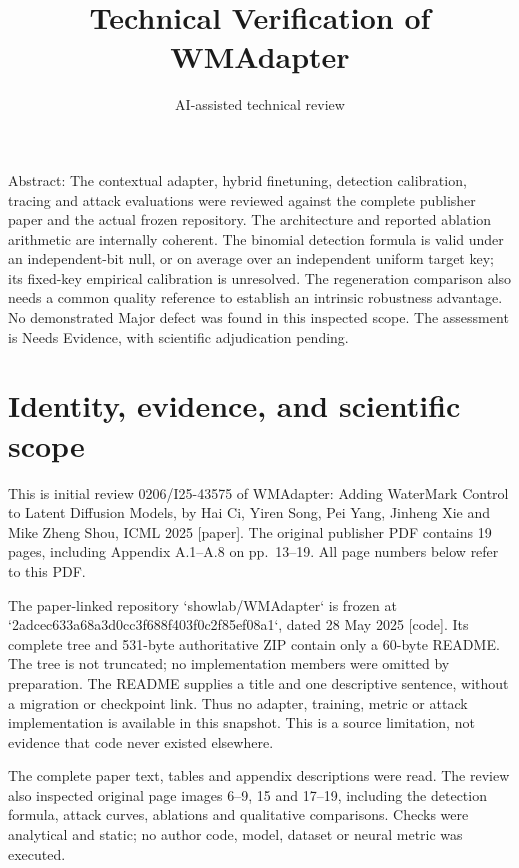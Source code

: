 \documentclass[10pt]{article}
\title{Technical Verification of WMAdapter}
\author{AI-assisted technical review}
\date{}
\begin{document}
\maketitle
Abstract: The contextual adapter, hybrid finetuning, detection calibration, tracing and attack evaluations were reviewed against the complete publisher paper and the actual frozen repository. The architecture and reported ablation arithmetic are internally coherent. The binomial detection formula is valid under an independent-bit null, or on average over an independent uniform target key; its fixed-key empirical calibration is unresolved. The regeneration comparison also needs a common quality reference to establish an intrinsic robustness advantage. No demonstrated Major defect was found in this inspected scope. The assessment is Needs Evidence, with scientific adjudication pending.\par
\section*{Identity, evidence, and scientific scope}
This is initial review 0206/I25-43575 of WMAdapter: Adding WaterMark Control to Latent Diffusion Models, by Hai Ci, Yiren Song, Pei Yang, Jinheng Xie and Mike Zheng Shou, ICML 2025 [paper]. The original publisher PDF contains 19 pages, including Appendix A.1–A.8 on pp. 13–19. All page numbers below refer to this PDF.\par
The paper-linked repository `showlab/WMAdapter` is frozen at `2adcec633a68a3d0cc3f688f403f0c2f85ef08a1`, dated 28 May 2025 [code]. Its complete tree and 531-byte authoritative ZIP contain only a 60-byte README. The tree is not truncated; no implementation members were omitted by preparation. The README supplies a title and one descriptive sentence, without a migration or checkpoint link. Thus no adapter, training, metric or attack implementation is available in this snapshot. This is a source limitation, not evidence that code never existed elsewhere.\par
The complete paper text, tables and appendix descriptions were read. The review also inspected original page images 6–9, 15 and 17–19, including the detection formula, attack curves, ablations and qualitative comparisons. Checks were analytical and static; no author code, model, dataset or neural metric was executed.\par
\end{document}
